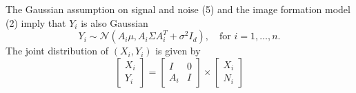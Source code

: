 The Gaussian assumption on signal and noise (5) and the image formation model (2) imply that $Y_i$ is also Gaussian
\begin{equation}
Y_i \sim \mathcal{N}(A_i \mu, A_i \Sigma A_i^T + \sigma^2 I_d),\quad \text{for } i=1,\ldots,n.
\end{equation} 
The joint distribution of $(X_i, Y_i)$ is given by
\begin{equation}
 \left[\begin{array}{c} X_i \\ Y_i \end{array}\right] = 
\begin{bmatrix} I & 0 \\ A_i & I \end{bmatrix} \times \left[ \begin{array}{c} X_i \\ N_i \end{array} \right]      
\end{equation}
